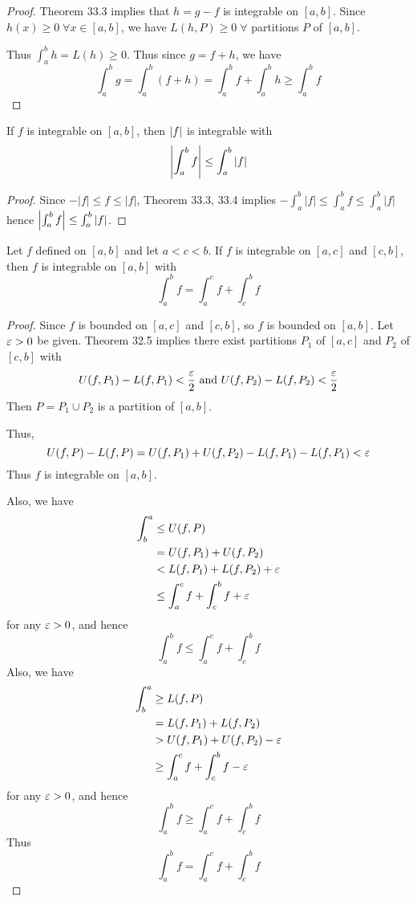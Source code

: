 \documentclass{article}
\begin{document}
  \begin{proof}
    Theorem 33.3 implies that $h = g - f$ is integrable on $[a, b]$. Since $h(x) \geq 0 \; \forall x \in [a, b]$, we have $L(h, P) \geq 0 \; \forall$ partitions $P$ of $[a, b]$.

    Thus $\int_a^b h = L(h) \geq 0$. Thus since $g = f + h$, we have \[\int_a^b g = \int_a^b (f + h) = \int_a^b f + \int_a^b h \geq \int_a^b f\]
  \end{proof}
  \begin{cthm}[Theorem 33.5]
    If $f$ is integrable on $[a, b]$, then $\abs{f}$ is integrable with \[
      \abs{\int_a^b f} \leq \int_a^b \abs{f}
    \]
  \end{cthm}
  \begin{proof}
    Since $-|f| \leq f \leq |f|$, Theorem 33.3, 33.4 implies $-\int_a^b |f| \leq \int_a^b f \leq \int_a^b |f|$ hence $\abs{\int_a^b f} \leq \int_a^b \abs{f}$.
  \end{proof}
  \begin{cthm}[Theorem 33.6]
    Let $f$ defined on $[a, b]$ and let $a < c < b$. If $f$ is integrable on $[a, c]$ and $[c, b]$, then $f$ is integrable on $[a, b]$ with \[
      \int_a^b f = \int_a^c f + \int_c^b f
    \]
  \end{cthm}
  \begin{proof}
    Since $f$ is bounded on $[a, c]$ and $[c, b]$, so $f$ is bounded on $[a, b]$. Let $\varepsilon > 0$ be given. Theorem 32.5 implies there exist partitions $P_1$ of $[a, c]$ and $P_2$ of $[c, b]$ with \[
      U(f, P_1) - L(f, P_1) < \frac{\varepsilon}{2} \text{ and } U(f, P_2) - L(f, P_2) < \frac{\varepsilon}{2}
    \]
    Then $P = P_1 \cup P_2$ is a partition of $[a, b]$.

    Thus, \[
      U(f, P) - L(f, P) = U(f, P_1) + U(f, P_2) - L(f, P_1) - L(f, P_1) < \varepsilon
    \]
    Thus $f$ is integrable on $[a, b]$.

    Also, we have
    \begin{align*}
      \int_b^a &\leq U(f, P)\\
      &= U(f, P_1) + U(f, P_2)\\
      &< L(f, P_1) + L(f, P_2) + \varepsilon\\
      &\leq \int_a^c f + \int_c^b f + \varepsilon\\
    \end{align*}
    for any $\varepsilon > 0$, and hence \[
      \int_a^b f \leq \int_a^c f + \int_c^b f
    \]
    Also, we have
    \begin{align*}
      \int_b^a &\geq L(f, P)\\
      &= L(f, P_1) + L(f, P_2)\\
      &> U(f, P_1) + U(f, P_2) - \varepsilon\\
      &\geq \int_a^c f + \int_c^b f - \varepsilon\\
    \end{align*}
    for any $\varepsilon > 0$, and hence \[
      \int_a^b f \geq \int_a^c f + \int_c^b f
    \]
    Thus \[
      \int_a^b f = \int_a^c f + \int_c^b f
    \]
  \end{proof}
\end{document}
